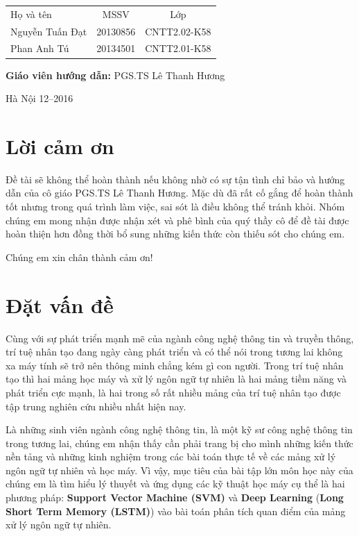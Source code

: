 \documentclass[a4paper,12pt]{report}
\begin{document}
\begin{longtable}{l c c}

Họ và tên & MSSV  & Lớp\\

Nguyễn Tuấn Đạt & 20130856 & CNTT2.02-K58 \\
Phan Anh Tú &   20134501 & CNTT2.01-K58\\

\end{longtable}

\hspace{1cm}\fontsize{14}{16}\selectfont \textbf{Giáo viên hướng dẫn: }PGS.TS Lê Thanh Hương \\[2cm]
\begin{center}
\fontsize{16}{19}\selectfont Hà Nội 12--2016

\end{center}
\newpage
\tableofcontents
\listoffigures

\chapter*{Lời cảm ơn}
{}
Đề tài sẽ không thể hoàn thành nếu không nhờ có sự tận tình chỉ bảo và hướng dẫn của cô giáo PGS.TS Lê Thanh Hương. Mặc dù đã rất cố gắng để hoàn thành tốt nhưng trong quá trình làm việc, sai sót là điều không thể tránh khỏi. Nhóm chúng em mong nhận được nhận xét và phê bình của quý thầy cô để đề tài được hoàn thiện hơn đồng thời bổ sung những kiến thức còn thiếu sót cho chúng em.


Chúng em xin chân thành cảm ơn!

\chapter{Đặt vấn đề }
Cùng với sự phát triển mạnh mẽ của ngành công nghệ thông tin và truyền thông, trí tuệ nhân tạo đang ngày càng phát triển và có thể nói trong tương lai không xa máy tính sẽ trở nên thông minh chẳng kém gì con người. Trong trí tuệ nhân tạo thì hai mảng học máy và xử lý ngôn ngữ tự nhiên là hai mảng tiềm năng và phát triển cực mạnh, là hai trong số rất nhiều mảng của trí tuệ nhân tạo được tập trung nghiên cứu nhiều nhất hiện nay.


Là những sinh viên ngành công nghệ thông tin, là một kỹ sư công nghệ thông tin trong tương lai, chúng em nhận thấy cần phải trang bị cho mình những kiến thức nền tảng và những kinh nghiệm trong các bài toán thực tế về các mảng xử lý ngôn ngữ tự nhiên và học máy. Vì vậy, mục tiêu của bài tập lớn môn học này của chúng em là tìm hiểu lý thuyết và ứng dụng các kỹ thuật học máy cụ thể là hai phương pháp: \textbf{Support Vector Machine (SVM)} và \textbf{Deep Learning} (\textbf{Long Short Term Memory (LSTM)}) vào bài toán phân tích quan điểm của mảng xử lý ngôn ngữ tự nhiên.
\end{document}
